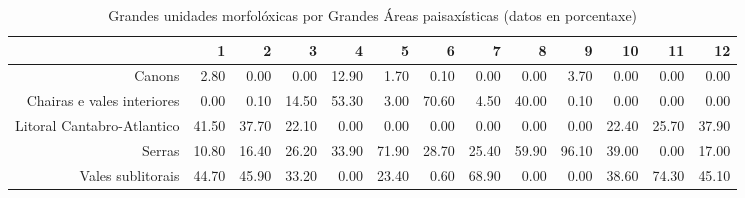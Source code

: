 \begin{table}[p]
\centering
\caption{Grandes unidades morfolóxicas por Grandes Áreas paisaxísticas (datos en porcentaxe)} 
\label{xtaboa1p}
\begin{tabular}{rrrrrrrrrrrrr}
  \hline
 & 1 & 2 & 3 & 4 & 5 & 6 & 7 & 8 & 9 & 10 & 11 & 12 \\ 
  \hline
Canons & 2.80 & 0.00 & 0.00 & 12.90 & 1.70 & 0.10 & 0.00 & 0.00 & 3.70 & 0.00 & 0.00 & 0.00 \\ 
  Chairas e vales interiores & 0.00 & 0.10 & 14.50 & 53.30 & 3.00 & 70.60 & 4.50 & 40.00 & 0.10 & 0.00 & 0.00 & 0.00 \\ 
  Litoral Cantabro-Atlantico & 41.50 & 37.70 & 22.10 & 0.00 & 0.00 & 0.00 & 0.00 & 0.00 & 0.00 & 22.40 & 25.70 & 37.90 \\ 
  Serras & 10.80 & 16.40 & 26.20 & 33.90 & 71.90 & 28.70 & 25.40 & 59.90 & 96.10 & 39.00 & 0.00 & 17.00 \\ 
  Vales sublitorais & 44.70 & 45.90 & 33.20 & 0.00 & 23.40 & 0.60 & 68.90 & 0.00 & 0.00 & 38.60 & 74.30 & 45.10 \\ 
   \hline
\end{tabular}
\end{table}
